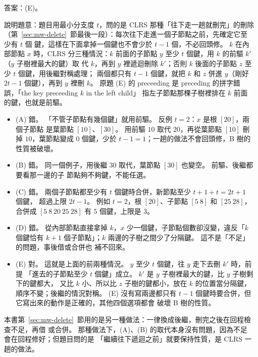 答案：(E)。

說明題意：題目用最小分支度 $t$，問的是 CLRS 那種「往下走一趟就刪完」的刪除
（第~\ref{sec:mw-delete}~節最後一段）：每次往下走進一個子節點之前，先確定它至少有 $t$ 個
鍵，這樣在下面拿掉一個鍵也不會少於 $t - 1$ 個，不必回頭修。 $k$ 在內部節點 $x$ 時，CLRS
分三種情況：$k$ 前面的子節點 $y$ 至少 $t$ 個鍵，用 $k$ 的前驅 $k'$（$y$ 子樹裡最大的鍵）取
代 $k$，再到 $y$ 裡遞迴刪除 $k'$；否則 $k$ 後面的子節點 $z$ 至少 $t$ 個鍵，用後繼對稱處理；
兩個都只有 $t - 1$ 個鍵，就把 $k$ 和 $z$ 併進 $y$（剛好 $2t - 1$ 個鍵），再到 $y$ 裡刪 $k$。
原題 (E) 的 preceeding 是 preceding 的拼字錯誤，「the key preceeding $k$ in the left child」
指左子節點那棵子樹裡排在 $k$ 前面的鍵，也就是前驅。

\begin{itemize}
\item (A) 錯。 「不管子節點有幾個鍵」就用前驅。 反例 $t = 2$：$x$ 是根 $[20]$，兩個子節點
是葉節點 $[10]$、$[30]$。 用前驅 $10$ 取代 $20$，再從葉節點 $[10]$ 刪掉 $10$，葉節點變成
$0$ 個鍵，少於 $t - 1 = 1$；一趟的做法不會回頭修，B 樹的性質被破壞。
\item (B) 錯。 同一個例子，用後繼 $30$ 取代，葉節點 $[30]$ 也變空。 前驅、後繼都要看那一邊的子
節點夠不夠鍵，不能任選。
\item (C) 錯。 兩個子節點都至少有 $t$ 個鍵時合併，新節點至少 $t + 1 + t = 2t + 1$ 個鍵，
超過上限 $2t - 1$。 例如 $t = 2$，根 $[20]$、子節點 $[5\ 8]$ 和 $[25\ 28]$，合併成
$[5\ 8\ 20\ 25\ 28]$ 有 $5$ 個鍵，上限是 $3$。
\item (D) 錯。 從內部節點直接拿掉 $k$，$x$ 少一個鍵，子節點個數卻沒變，違反「$k$ 個鍵恰有
$k + 1$ 個子節點」；$k$ 兩邊的子樹之間少了分隔鍵。 這不是「不足」的問題，事後借或合併也
補不回來。
\item (E) 對。 這就是上面的前兩種情況。 $y$ 至少 $t$ 個鍵，往 $y$ 走下去刪 $k'$ 時，前提
「進去的子節點至少 $t$ 個鍵」成立。 $k'$ 是 $y$ 子樹裡最大的鍵，比 $y$ 子樹剩下的鍵都大，
又比 $k$ 小、所以比 $z$ 子樹的鍵都小，放在 $k$ 的位置當分隔鍵，順序不變；後繼的情況對稱。
(E) 沒有寫兩邊都只有 $t - 1$ 個鍵時要合併，但它寫出來的動作是正確的，其他四個選項都會
破壞 B 樹的性質。
\end{itemize}
本書第~\ref{sec:mw-delete}~節用的是另一種做法：一律換成後繼，刪完之後在回程檢查不足，再借
或合併。 那種做法下，(A)、(B) 的取代本身沒有問題，因為不足會在回程修好；但題目問的是
「繼續往下遞迴之前」就要保持性質，是 CLRS 一趟的做法。


